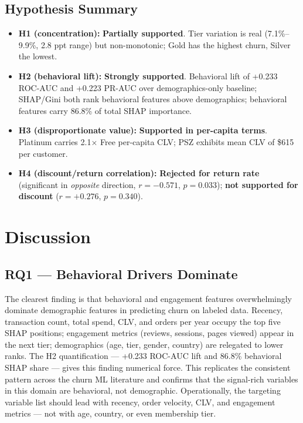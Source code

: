 \documentclass[conference]{IEEEtran}
\begin{document}
\subsection{Hypothesis Summary}

\begin{itemize}
\item \textbf{H1 (concentration):} \textbf{Partially supported}. Tier variation is real (7.1\%--9.9\%, 2.8 ppt range) but non-monotonic; Gold has the highest churn, Silver the lowest.
\item \textbf{H2 (behavioral lift):} \textbf{Strongly supported}. Behavioral lift of +0.233 ROC-AUC and +0.223 PR-AUC over demographics-only baseline; SHAP/Gini both rank behavioral features above demographics; behavioral features carry 86.8\% of total SHAP importance.
\item \textbf{H3 (disproportionate value):} \textbf{Supported in per-capita terms}. Platinum carries 2.1$\times$ Free per-capita CLV; PSZ exhibits mean CLV of \$615 per customer.
\item \textbf{H4 (discount/return correlation):} \textbf{Rejected for return rate} (significant in \emph{opposite} direction, $r = -0.571$, $p = 0.033$); \textbf{not supported for discount} ($r = +0.276$, $p = 0.340$).
\end{itemize}

\section{Discussion}

\subsection{RQ1 — Behavioral Drivers Dominate}

The clearest finding is that behavioral and engagement features overwhelmingly dominate demographic features in predicting churn on labeled data. Recency, transaction count, total spend, CLV, and orders per year occupy the top five SHAP positions; engagement metrics (reviews, sessions, pages viewed) appear in the next tier; demographics (age, tier, gender, country) are relegated to lower ranks. The H2 quantification — +0.233 ROC-AUC lift and 86.8\% behavioral SHAP share — gives this finding numerical force. This replicates the consistent pattern across the churn ML literature \cite{ahmad2019,decaigny2018} and confirms that the signal-rich variables in this domain are behavioral, not demographic. Operationally, the targeting variable list should lead with recency, order velocity, CLV, and engagement metrics — not with age, country, or even membership tier.
\end{document}
